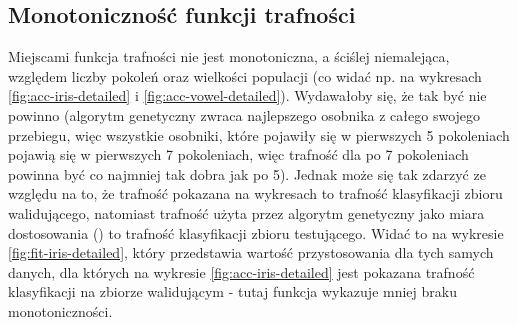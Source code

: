%	
%	
%	

\FloatBarrier
	\subsection{Monotoniczność funkcji trafności}	
	Miejscami funkcja trafności nie jest monotoniczna, a ściślej niemalejąca, względem liczby pokoleń oraz wielkości populacji (co widać np. na wykresach \ref{fig:acc-iris-detailed} i \ref{fig:acc-vowel-detailed}). Wydawałoby się, że tak być nie powinno (algorytm genetyczny zwraca najlepszego osobnika z całego swojego przebiegu, więc wszystkie osobniki, które pojawiły się w pierwszych 5 pokoleniach pojawią się w pierwszych 7 pokoleniach, więc trafność dla po 7 pokoleniach powinna być co najmniej tak dobra jak po 5). Jednak może się tak zdarzyć ze względu na to, że trafność pokazana na wykresach to trafność klasyfikacji zbioru walidującego, natomiast trafność użyta przez algorytm genetyczny jako miara dostosowania () to trafność klasyfikacji zbioru testującego. Widać to na wykresie \ref{fig:fit-iris-detailed}, który przedstawia wartość przystosowania dla tych samych danych, dla których na wykresie \ref{fig:acc-iris-detailed} jest pokazana trafność klasyfikacji na zbiorze walidującym - tutaj funkcja wykazuje mniej braku monotoniczności. 

